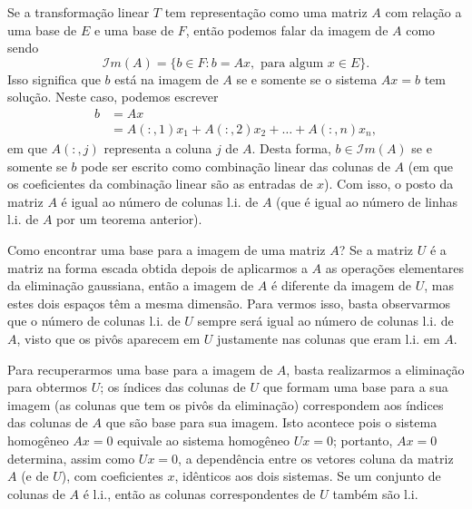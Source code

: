 Se a transformação linear $T$ tem representação como uma matriz $A$ com relação a uma base de $E$ e uma base de $F$, então podemos falar da imagem de $A$ como sendo 
\begin{equation*}
	{\mathcal{I}}m(A) = \{ b\in F : b=Ax, \text{ para algum } x \in E\}.
\end{equation*}
Isso significa que $b$ está na imagem de $A$ se e somente se o sistema $Ax=b$ tem solução. Neste caso, podemos escrever
\begin{align*}
	b &= Ax\\
      &= A(:,1)x_1 + A(:,2)x_2 + \ldots + A(:,n)x_n,
\end{align*}
em que $A(:,j)$ representa a coluna $j$ de $A$. Desta forma, $b \in {\mathcal{I}}m(A)$ se e somente se $b$ pode ser escrito como combinação linear das colunas de $A$ (em que os coeficientes da combinação linear são as entradas de $x$). Com isso, o posto da matriz $A$ é igual ao número de colunas l.i. de $A$ (que é igual ao número de linhas l.i. de $A$ por um teorema anterior).

Como encontrar uma base para a imagem de uma matriz $A$? Se a matriz $U$ é a matriz na forma escada obtida depois de aplicarmos a $A$ as operações elementares da eliminação gaussiana, então a imagem de $A$ é diferente da imagem de $U$, mas estes dois espaços têm a mesma dimensão. Para vermos isso, basta observarmos que o número de colunas l.i. de $U$ sempre será igual ao número de colunas l.i. de $A$, visto que os pivôs aparecem em $U$ justamente nas colunas que eram l.i. em $A$. 

Para recuperarmos uma base para a imagem de $A$, basta realizarmos a eliminação para obtermos $U$; os índices das colunas de $U$ que formam uma base para a sua imagem (as colunas que tem os pivôs da eliminação) correspondem aos índices das colunas de $A$ que são base para sua imagem. Isto acontece pois o sistema homogêneo $Ax=0$ equivale ao sistema homogêneo $Ux=0$; portanto, $Ax=0$ determina, assim como $Ux=0$, a dependência entre os vetores coluna da matriz $A$ (e de $U$), com coeficientes $x$, idênticos aos dois sistemas. Se um conjunto de colunas de $A$ é l.i., então as colunas correspondentes de $U$ também são l.i.


